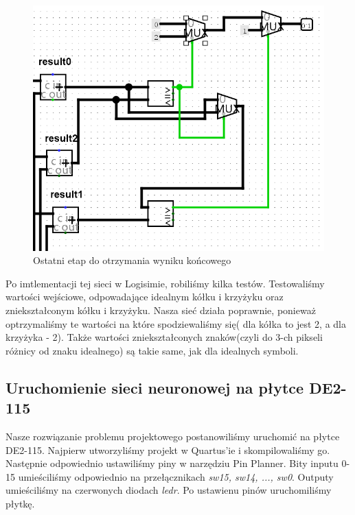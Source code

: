 \documentclass[a4paper, titleauthor]{mwart}
\begin{document}
\begin{figure}[h]
\centering
    \includegraphics[width=0.7\linewidth]{Out.png}
    \caption{Ostatni etap do otrzymania wyniku końcowego}
\end{figure}

Po imtlementacji tej sieci w Logisimie, robiliśmy kilka testów. Testowaliśmy wartości wejściowe, odpowadające idealnym kółku i krzyżyku oraz zniekształconym kółku i krzyżyku. Nasza sieć działa poprawnie, ponieważ optrzymaliśmy te wartości na które spodziewaliśmy się( dla kółka to jest 2, a dla krzyżyka - 2). Także wartości zniekształconych znaków(czyli do 3-ch pikseli różnicy od znaku idealnego) są takie same, jak dla idealnych symboli.
\newpage
\subsection{Uruchomienie sieci neuronowej na płytce DE2-115}
Nasze rozwiązanie problemu projektowego postanowiliśmy uruchomić na płytce DE2-115.\newline
Najpierw utworzyliśmy projekt w Quartus'ie i skompilowaliśmy go.
Następnie odpowiednio ustawiliśmy piny w narzędziu Pin Planner. Bity inputu 0-15 umieściliśmy odpowiednio na przełącznikach \emph{sw15, sw14, ..., sw0}. Outputy umieściliśmy na czerwonych diodach \emph{ledr}. Po ustawienu pinów uruchomiliśmy płytkę.\newline
\end{document}
